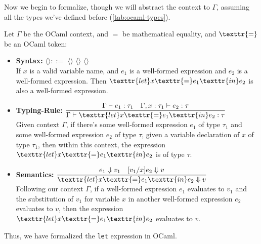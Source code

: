 \noindent
Now we begin to formalize, though we will abstract the context to $\Gamma$, assuming 
all the types we've defined before (\ref{tab:ocaml-types}).
\begin{Def}

    Let $\Gamma$ be the OCaml context, and $=$ be mathematical equality, and $\texttr{=}$ be an OCaml token:
    \begin{itemize}
        \item \textbf{Syntax:} \LARGE $\langle$$\rangle::=$  $\langle$$\rangle$ \texttr{=} $\langle$$\rangle$  $\langle$$\rangle$ \normalsize\\
        
        \vspace{-.5em}
        \noindent
        If $x$ is a valid variable name, and $e_1$ is a well-formed expression and $e_2$ is a well-formed expression. Then $\texttr{let }x\texttr{ = }e_1\texttr{ in }e_2$ is also a well-formed expression.
        \item \textbf{Typing-Rule:} \LARGE $\dfrac{\Gamma\vdash e_1:\tau_1 \quad \Gamma,x:\tau_1\vdash e_2:\tau}{\Gamma\vdash\texttr{let }x\texttr{ = }e_1\texttr{ in }e_2:\tau}$ \normalsize\\
        
        \noindent
        Given context $\Gamma$, if there's some well-formed expression $e_1$ of type $\tau_1$ and some well-formed expression $e_2$ of type $\tau$, given a variable declaration of $x$ of type $\tau_1$, 
        then within this context, the expression $\texttr{let }x\texttr{  = }e_1\texttr{ in }e_2$ is of type $\tau$.
        
        \item \textbf{Semantics:} \LARGE $\dfrac{e_1\Downarrow v_1 \quad [v_1/x]e_2\Downarrow v}{\texttr{let }x\texttr{ = }e_1\texttr{ in }e_2\Downarrow v}$ \normalsize\\
        
        \noindent
        Following our context $\Gamma$, if a well-formed expression $e_1$ evaluates to $v_1$ and the substitution of $v_1$ for variable $x$ in another 
        well-formed expression $e_2$ evaluates to $v$, then the expression $\texttr{let }x\texttr{ = }e_1\texttr{ in }e_2$ evaluates to $v$.
    \end{itemize}

    \noindent
    Thus, we have formalized the \texttt{let} expression in OCaml.
\end{Def}

